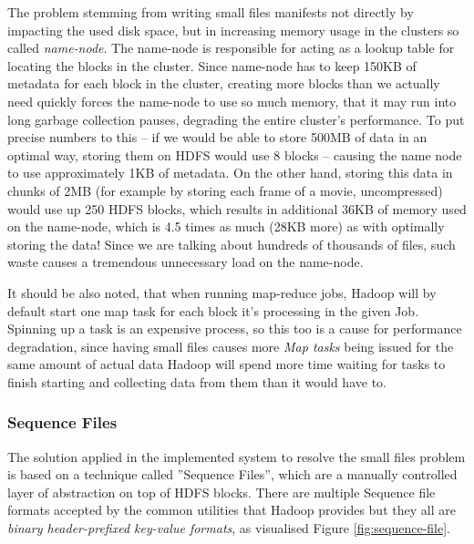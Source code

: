 The problem stemming from writing small files manifests not directly by impacting the used disk space, but in increasing memory usage in the clusters so called \textit{name-node}. The name-node is responsible for acting as a lookup table for locating the blocks in the cluster. Since name-node has to keep 150KB of metadata for each block in the cluster, creating more blocks than we actually need quickly forces the name-node to use so much memory, that it may run into long garbage collection pauses, degrading the entire cluster's performance. To put precise numbers to this -- if we would be able to store 500MB of data in an optimal way, storing them on HDFS would use 8 blocks -- causing the name node to use approximately 1KB of metadata. On the other hand, storing this data in chunks of 2MB (for example by storing each frame of a movie, uncompressed) would use up 250 HDFS blocks, which results in additional 36KB of memory used on the name-node, which is 4.5 times as much (28KB more) as with optimally storing the data! Since we are talking about hundreds of thousands of files, such waste causes a tremendous unnecessary load on the name-node.

It should be also noted, that when running map-reduce jobs, Hadoop will by default start one map task for each block it's processing in the given Job. Spinning up a task is an expensive process, so this too is a cause for performance degradation, since having small files causes more \textit{Map tasks} being issued for the same amount of actual data Hadoop will spend more time waiting for tasks to finish starting and collecting data from them than it would have to.

\subsubsection{Sequence Files}
\label{sequence-file}
The solution applied in the implemented system to resolve the small files problem is based on a technique called ''Sequence Files'', which are a manually controlled layer of abstraction on top of HDFS blocks. There are multiple Sequence file formats accepted by the common utilities that Hadoop provides \cite{hadoop-seq-files} but they all are \textit{binary header-prefixed key-value formats}, as visualised Figure \ref{fig:sequence-file}.


